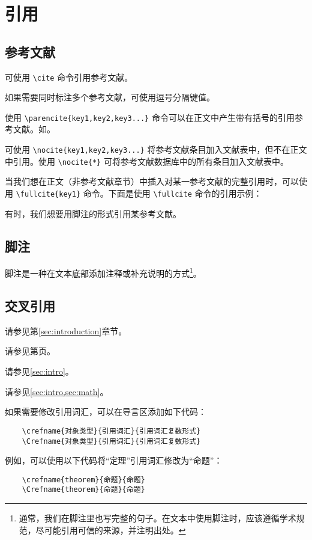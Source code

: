 \section{引用}\label{sec:reference}

\subsection{参考文献}

可使用 \verb|\cite| 命令引用参考文献。\cite{MSSB201404007}

如果需要同时标注多个参考文献，可使用逗号分隔键值。\cite{MSSB201404007,TJLT200705022}

使用 \verb|\parencite{key1,key2,key3...}| 命令可以在正文中产生带有括号的引用参考文献。如\parencite{MSSB201404007}。

可使用 \verb|\nocite{key1,key2,key3...}| 将参考文献条目加入文献表中，但不在正文中引用。使用 \verb|\nocite{*}| 可将参考文献数据库中的所有条目加入文献表中。

当我们想在正文（非参考文献章节）中插入对某一参考文献的完整引用时，可以使用 \verb|\fullcite{key1}| 命令。下面是使用 \verb|\fullcite| 命令的引用示例：


有时，我们想要用脚注的形式引用某参考文献。

\subsection{脚注}

脚注是一种在文本底部添加注释或补充说明的方式\footnote{通常，我们在脚注里也写完整的句子。在文本中使用脚注时，应该遵循学术规范，尽可能引用可信的来源，并注明出处。}。

\subsection{交叉引用}

请参见第\ref{sec:introduction}章节。

请参见第\pageref{sec:introduction}页。

请参见\cref{sec:intro}。

请参见\cref{sec:intro,sec:math}。

如果需要修改引用词汇，可以在导言区添加如下代码：

\begin{Verbatim}
    \crefname{对象类型}{引用词汇}{引用词汇复数形式}
    \Crefname{对象类型}{引用词汇}{引用词汇复数形式}
\end{Verbatim}

例如，可以使用以下代码将“定理”引用词汇修改为“命题”：

\begin{Verbatim}
    \crefname{theorem}{命题}{命题}
    \Crefname{theorem}{命题}{命题}
\end{Verbatim}